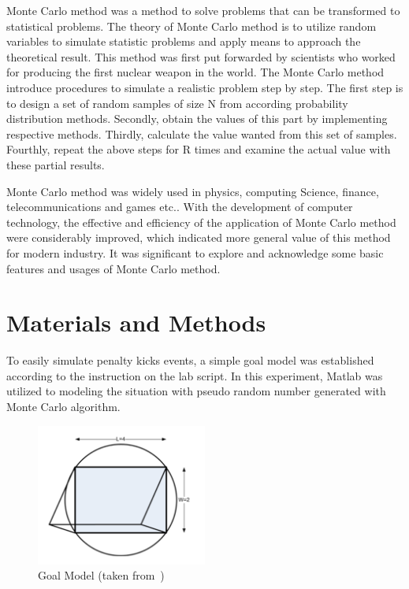 \documentclass[11pt, a4paper]{article}
\begin{document}
Monte Carlo method was a method to solve problems that can be transformed to statistical problems. The theory of Monte Carlo method is to utilize random variables to simulate statistic problems and apply means to approach the theoretical result. This method was first put forwarded by scientists who worked for producing the first nuclear weapon in the world. The Monte Carlo method introduce procedures to simulate a realistic problem step by step. The first step is to design a set of random samples of size N from according probability distribution methods. Secondly, obtain the values of this part by implementing respective methods. Thirdly, calculate the value wanted from this set of samples. Fourthly, repeat the above steps for R times and examine the actual value with these partial results. \cite{ref:lab}

Monte Carlo method was widely used in physics, computing Science, finance, telecommunications and games etc.. With the development of computer technology, the effective and efficiency of the application of Monte Carlo method were considerably improved, which indicated more general value of this method for modern industry. It was significant to explore and acknowledge some basic features and usages of Monte Carlo method.


\section{Materials and Methods}



To easily simulate penalty kicks events, a simple goal model was established according to the instruction on the lab script\cite{ref:lab}. In this experiment, Matlab was utilized to modeling the situation with pseudo random number generated with Monte Carlo algorithm.


\begin{figure}[htbp]     \begin{centering}
    \includegraphics[width=0.5\textwidth]{goal.png}
    \caption{Goal Model (taken from~\cite{ref:lab})}
    \label{Fig:goal}
    \end{centering}
\end{figure}
\end{document}
